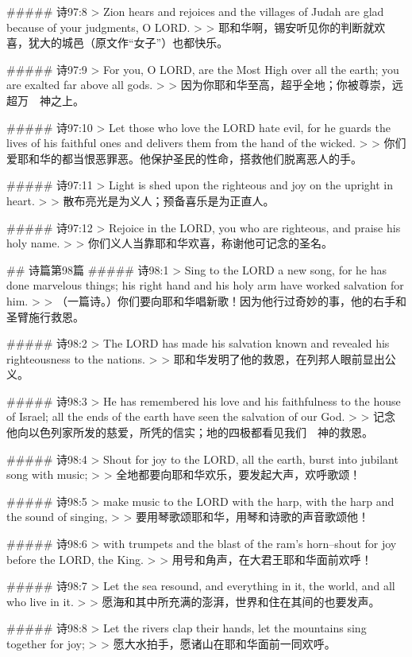 ##### 诗97:8
> Zion hears and rejoices and the villages of Judah are glad because of your judgments, O LORD.
>
> 耶和华啊，锡安听见你的判断就欢喜，犹大的城邑（原文作“女子”）也都快乐。


##### 诗97:9
> For you, O LORD, are the Most High over all the earth; you are exalted far above all gods.
>
> 因为你耶和华至高，超乎全地；你被尊崇，远超万　神之上。


##### 诗97:10
> Let those who love the LORD hate evil, for he guards the lives of his faithful ones and delivers them from the hand of the wicked.
>
> 你们爱耶和华的都当恨恶罪恶。他保护圣民的性命，搭救他们脱离恶人的手。


##### 诗97:11
> Light is shed upon the righteous and joy on the upright in heart.
>
> 散布亮光是为义人；预备喜乐是为正直人。


##### 诗97:12
> Rejoice in the LORD, you who are righteous, and praise his holy name.
>
> 你们义人当靠耶和华欢喜，称谢他可记念的圣名。


## 诗篇第98篇
##### 诗98:1
> Sing to the LORD a new song, for he has done marvelous things; his right hand and his holy arm have worked salvation for him.
>
> （一篇诗。）你们要向耶和华唱新歌！因为他行过奇妙的事，他的右手和圣臂施行救恩。


##### 诗98:2
> The LORD has made his salvation known and revealed his righteousness to the nations.
>
> 耶和华发明了他的救恩，在列邦人眼前显出公义。


##### 诗98:3
> He has remembered his love and his faithfulness to the house of Israel; all the ends of the earth have seen the salvation of our God.
>
> 记念他向以色列家所发的慈爱，所凭的信实；地的四极都看见我们　神的救恩。


##### 诗98:4
> Shout for joy to the LORD, all the earth, burst into jubilant song with music;
>
> 全地都要向耶和华欢乐，要发起大声，欢呼歌颂！


##### 诗98:5
> make music to the LORD with the harp, with the harp and the sound of singing,
>
> 要用琴歌颂耶和华，用琴和诗歌的声音歌颂他！


##### 诗98:6
> with trumpets and the blast of the ram's horn--shout for joy before the LORD, the King.
>
> 用号和角声，在大君王耶和华面前欢呼！


##### 诗98:7
> Let the sea resound, and everything in it, the world, and all who live in it.
>
> 愿海和其中所充满的澎湃，世界和住在其间的也要发声。


##### 诗98:8
> Let the rivers clap their hands, let the mountains sing together for joy;
>
> 愿大水拍手，愿诸山在耶和华面前一同欢呼。


